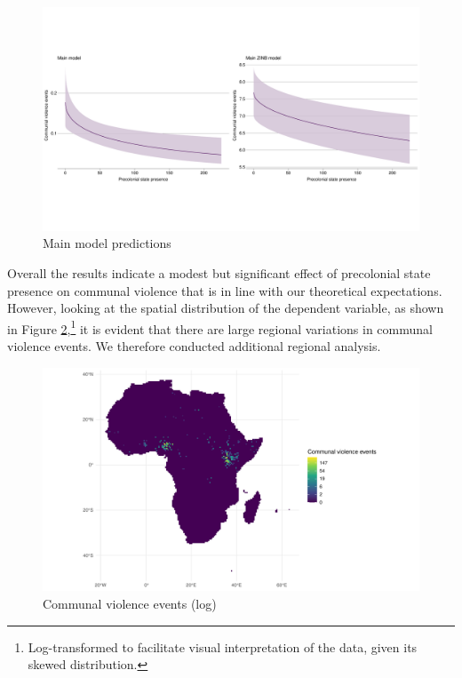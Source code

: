 \begin{figure}[htpb]
	\centering
	\includegraphics[width=1\linewidth]{R/Output/mainplots.pdf}
	\caption{Main model predictions}
	\label{mainmodels}
\end{figure}

Overall the results indicate a modest but significant effect of precolonial
state presence on communal violence that is in line with our theoretical
expectations. However, looking at the spatial distribution of the dependent
variable, as shown in Figure \ref{logOrg3},\footnote{Log-transformed to
facilitate visual interpretation of the data, given its skewed distribution.}
it is evident that there are large regional variations in communal violence
events. We therefore conducted additional regional analysis.

\begin{figure}[htpb]
	\centering
	\includegraphics[width=1\linewidth]{R/Output/logOrg3.pdf}
	\caption{Communal violence events (log)}%
	\label{logOrg3}
\end{figure}

